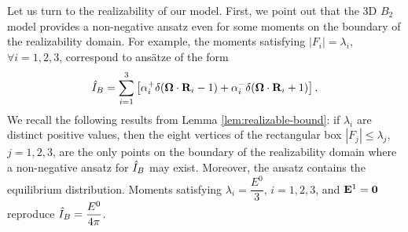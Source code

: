Let us turn to the realizability of our model. First, we point out
that the 3D $B_2$ model provides a non-negative ansatz even for some
moments on the boundary of the realizability domain. For example,
the moments satisfying $|F_i| = \lambda_i$, $\forall i = 1, 2, 3$, 
correspond to ans\"atze of the form
\[
  \hat I_B = \sum\limits_{i=1}^3
  \left[\alpha^+_i
    \delta(\boldsymbol{\Omega}\cdot\mathbf{R}_i-1)+
    \alpha^-_i
  \delta(\boldsymbol{\Omega}\cdot\mathbf{R}_i+1)\right].
\]
We recall the following results from Lemma \ref{lem:realizable-bound}: if
$\lambda_i$ are distinct positive values, then the eight vertices of 
the rectangular box $|F_j| \leq \lambda_j$, $j = 1,2,3$, are the only points 
on the boundary of the realizability domain where a non-negative 
ansatz for $\hat I_B$ may exist.
Moreover, the ansatz contains the equilibrium distribution.
Moments satisfying $\lambda_i = \dfrac{E^0}{3}$, $i=1,2,3$, and
$\mathbf{E}^1 = \boldsymbol{0}$ reproduce $\hat I_B = \dfrac{E^0}{4\pi}$.


